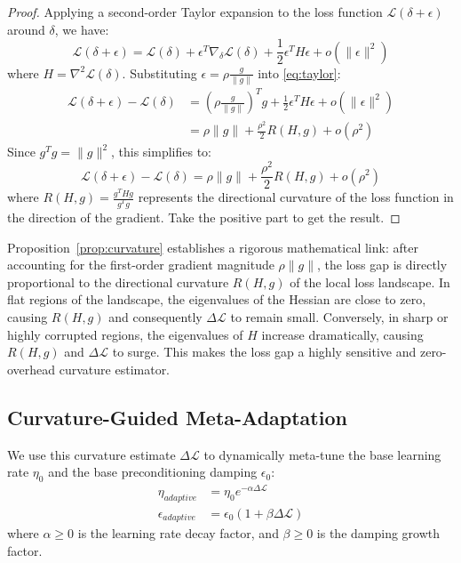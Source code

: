 \documentclass{article}
\theoremstyle{plain}
\theoremstyle{definition}
\theoremstyle{remark}
\begin{document}
\begin{proof}
Applying a second-order Taylor expansion to the loss function $\mathcal{L}(\delta + \epsilon)$ around $\delta$, we have:
\begin{equation}
\label{eq:taylor}
\mathcal{L}(\delta + \epsilon) = \mathcal{L}(\delta) + \epsilon^T \nabla_\delta \mathcal{L}(\delta) + \frac{1}{2} \epsilon^T H \epsilon + o(\|\epsilon\|^2)
\end{equation}
where $H = \nabla^2 \mathcal{L}(\delta)$. Substituting $\epsilon = \rho \frac{g}{\|g\|}$ into \cref{eq:taylor}:
\begin{align}
\mathcal{L}(\delta + \epsilon) - \mathcal{L}(\delta) &= \left(\rho \frac{g}{\|g\|}\right)^T g + \frac{1}{2} \epsilon^T H \epsilon + o(\|\epsilon\|^2) \nonumber \\
&= \rho \|g\| + \frac{\rho^2}{2} R(H, g) + o(\rho^2)
\end{align}
Since $g^T g = \|g\|^2$, this simplifies to:
\begin{equation}
\mathcal{L}(\delta + \epsilon) - \mathcal{L}(\delta) = \rho \|g\| + \frac{\rho^2}{2} R(H, g) + o(\rho^2)
\end{equation}
where $R(H, g) = \frac{g^T H g}{g^T g}$ represents the directional curvature of the loss function in the direction of the gradient. Take the positive part to get the result.
\end{proof}

Proposition~\ref{prop:curvature} establishes a rigorous mathematical link: after accounting for the first-order gradient magnitude $\rho \|g\|$, the loss gap is directly proportional to the directional curvature $R(H, g)$ of the local loss landscape. In flat regions of the landscape, the eigenvalues of the Hessian are close to zero, causing $R(H, g)$ and consequently $\Delta \mathcal{L}$ to remain small. Conversely, in sharp or highly corrupted regions, the eigenvalues of $H$ increase dramatically, causing $R(H, g)$ and $\Delta \mathcal{L}$ to surge. This makes the loss gap a highly sensitive and zero-overhead curvature estimator.

\subsection{Curvature-Guided Meta-Adaptation}
We use this curvature estimate $\Delta \mathcal{L}$ to dynamically meta-tune the base learning rate $\eta_0$ and the base preconditioning damping $\epsilon_0$:
\begin{align}
\eta_{adaptive} &= \eta_0 e^{-\alpha \Delta \mathcal{L}} \\
\epsilon_{adaptive} &= \epsilon_0 (1 + \beta \Delta \mathcal{L})
\end{align}
where $\alpha \ge 0$ is the learning rate decay factor, and $\beta \ge 0$ is the damping growth factor.
\end{document}
